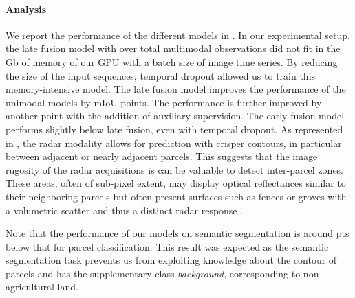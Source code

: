 \paragraph{\bf Analysis} We report the performance of the different models in . In our experimental setup, the late fusion model with {over}  total {multimodal} observations did not fit in {the Gb of memory of our GPU} with a batch size of  image time series. {By reducing the size of the input sequences, temporal dropout allowed us to  train this memory-intensive model.}
The late fusion model improves the performance of the unimodal models by  mIoU points. The performance is further improved by {another}  point with the addition of auxiliary supervision. {The early fusion model performs slightly below late fusion, even with temporal dropout. }
As represented in , the radar {modality allows for prediction with crisper contours, in particular between adjacent or nearly adjacent parcels}. This suggests that {the image rugosity}  {of the radar} acquisitions is {can be} valuable to detect inter-parcel zones. {These areas, often of sub-pixel extent,} may display optical reflectances {similar to their} neighboring parcels {but often present surfaces such as fences or groves with a volumetric scatter and thus a distinct radar response . }

Note that the performance of our models on semantic segmentation is around pts below that for parcel classification. This result was expected as {the semantic segmentation task prevents us from exploiting knowledge about the contour of parcels and has the supplementary class \emph{background}, corresponding to non-agricultural land.}


